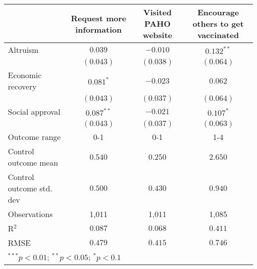 \begin{table}
\begin{center}
\begin{tabular}{l c c c}
\hline
 & Request more information & Visited PAHO website & Encourage others to get vaccinated \\
\hline
Altruism                 & $0.039$      & $-0.010$  & $0.132^{**}$ \\
                         & $(0.043)$    & $(0.038)$ & $(0.064)$    \\
Economic recovery        & $0.081^{*}$  & $-0.023$  & $0.062$      \\
                         & $(0.043)$    & $(0.037)$ & $(0.064)$    \\
Social approval          & $0.087^{**}$ & $-0.021$  & $0.107^{*}$  \\
                         & $(0.043)$    & $(0.037)$ & $(0.063)$    \\
\hline
Outcome range            & 0-1          & 0-1       & 1-4          \\
Control outcome mean     & $0.540$      & $0.250$   & $2.650$      \\
Control outcome std. dev & $0.500$      & $0.430$   & $0.940$      \\
Observations             & 1,011        & 1,011     & 1,085        \\
R$^{2}$                  & $0.087$      & $0.068$   & $0.411$      \\
RMSE                     & $0.479$      & $0.415$   & $0.746$      \\
\hline
\multicolumn{4}{l}{\scriptsize{$^{***}p<0.01$; $^{**}p<0.05$; $^{*}p<0.1$}}
\end{tabular}
\caption{}
\label{table:Tables and Figures/SI_table23_motiv_Colombia_behav}
\end{center}
\end{table}
